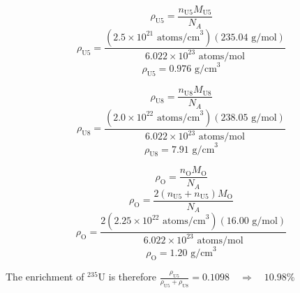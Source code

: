 \documentclass{report}
\begin{document}
\begin{multicols}{2}
$$ \rho_{\text{U5}} = \frac{n_{\text{U5}}  M_{\text{U5}} }{N_A} $$
$$ \rho_{\text{U5}} = \frac{(2.5\times10^{21}\text{ atoms/cm}^3)(235.04\text{ g/mol}) }{6.022\times10^{23}\text{ atoms/mol}} $$
$$\boxed{ \rho_{\text{U5}} = 0.976\text{ g/cm}^3 }$$


$$ \rho_{\text{U8}} = \frac{n_{\text{U8}}  M_{\text{U8}} }{N_A} $$
$$ \rho_{\text{U8}} = \frac{(2.0\times10^{22}\text{ atoms/cm}^3)(238.05\text{ g/mol}) }{6.022\times10^{23}\text{ atoms/mol}} $$
$$\boxed{ \rho_{\text{U8}} = 7.91\text{ g/cm}^3 }$$

\end{multicols}

$$ \rho_{\text{O}} = \frac{n_{\text{O}}  M_{\text{O}} }{N_A} $$
$$ \rho_{\text{O}} = \frac{2(n_{\text{U5}} + n_{\text{U5}})  M_{\text{O}} }{N_A} $$
$$ \rho_{\text{O}} = \frac{2(2.25\times10^{22}\text{ atoms/cm}^{3})(16.00\text{ g/mol}) }{6.022\times10^{23}\text{ atoms/mol}} $$
$$\boxed{ \rho_{\text{O}} = 1.20\text{ g/cm}^3 }$$

The enrichment of $^{235}$U is therefore
$\frac{\rho_{\text{U5}}}{\rho_{\text{U5}}+\rho_{\text{U8}}} = 0.1098 \quad\Rightarrow \quad\boxed{10.98\%}$
\end{document}
